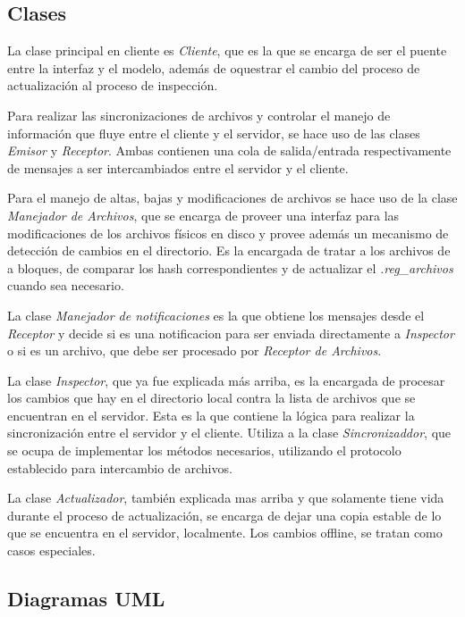 \documentclass{article}
\begin{document}
\subsection{Clases}

	La clase principal en cliente es \textit{Cliente}, que es la que se encarga de ser el puente entre la interfaz y el modelo, además de oquestrar el cambio del proceso de actualización al proceso de inspección. 
	\par
	Para realizar las sincronizaciones de archivos y controlar el manejo de información que fluye entre el cliente y el servidor, se hace uso de las clases \textit{Emisor} y \textit{Receptor}. Ambas contienen una cola de salida/entrada respectivamente de mensajes a ser intercambiados entre el servidor y el cliente. 
	\par
	Para el manejo de altas, bajas y modificaciones de archivos se hace uso de la clase \textit{Manejador de Archivos}, que se encarga de proveer una interfaz para las modificaciones de los archivos físicos en disco y provee además un mecanismo de detección de cambios en el directorio. Es la encargada de tratar a los archivos de a bloques, de comparar los hash correspondientes y de actualizar el \textit{.reg_archivos} cuando sea necesario. 
	\par
	La clase \textit{Manejador de notificaciones} es la que obtiene los mensajes desde el \textit{Receptor} y decide si es una notificacion para ser enviada directamente a \textit{Inspector} o si es un archivo, que debe ser procesado por \textit{Receptor de Archivos}. 
	\par
	La clase \textit{Inspector}, que ya fue explicada más arriba, es la encargada de procesar los cambios que hay en el directorio local contra la lista de archivos que se encuentran en el servidor. Esta es la que contiene la lógica para realizar la sincronización entre el servidor y el cliente. Utiliza a la clase \textit{Sincronizaddor}, que se ocupa de implementar los métodos necesarios, utilizando el protocolo establecido para intercambio de archivos.
	\par
	La clase \textit{Actualizador}, también explicada mas arriba y que solamente tiene vida durante el proceso de actualización, se encarga de dejar una copia estable de lo que se encuentra en el servidor, localmente. Los cambios offline, se tratan como casos especiales. 
\bigskip



\subsection{Diagramas UML}
\end{document}
